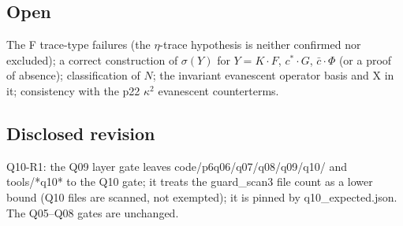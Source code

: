 \subsection*{Open}
The F trace-type failures (the $\eta$-trace hypothesis is neither confirmed nor excluded); a correct construction of
$\sigma(Y)$ for $Y=K\!\cdot\!F$, $c^*\!\cdot\!G$, $\bar c\!\cdot\!\Phi$ (or a proof of absence); classification of $N$;
the invariant evanescent operator basis and X in it; consistency with the p22 $\kappa^2$ evanescent counterterms.
\subsection*{Disclosed revision}
Q10-R1: the Q09 layer gate leaves code/p6q06/q07/q08/q09/q10/ and tools/*q10* to the Q10 gate; it treats the guard\_scan3 file count as a lower bound (Q10 files are scanned, not exempted); it is pinned by
q10\_expected.json. The Q05--Q08 gates are unchanged.
